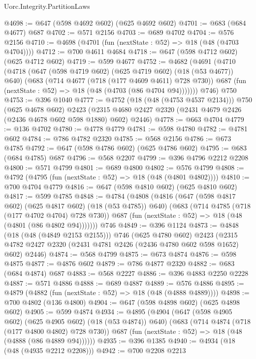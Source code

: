 \begin{lexlean}{Uorc.Integrity.PartitionLaws}
\begin{coremodule}
@4698 := @647 (@598 @4692 @602) (@625 @4692 @602)
@4701 := @683 (@684 @4677) @687
@4702 := @571 @2156
@4703 := @689 @4702
@4704 := @576 @2156
@4710 := @4698 (@4701 (fun (nextState : @52) => @18 (@48 (@4703 @4704))))
@4712 := @700 @4611 @4684
@4718 := @647 (@598 @4712 @602) (@625 @4712 @602)
@4719 := @599 @4677
@4752 := @4682
    (@4691
      (@4710
        (@4718
          (@647 (@598 @4719 @602) (@625 @4719 @602) (@18 (@53 @4677)) @640)
          (@683
            (@714 @4677 (@718 (@177 @4609 @4611) @728 @730))
            @687
            (fun (nextState : @52) => @18 (@48 (@4703 (@86 @4704 @94)))))))
      @746)
    @750
@4753 := @396 @1040
@4777 := @4752
    (@18 (@48 (@4753 @4537 @2134)))
    @750
    (@625 @4678 @602)
    @2423
    (@2315 @4680 @2427 @2320 (@2431 @4679 @2426 (@2436 @4678 @602 @598 @1880) @602) @2446)
@4778 := @663 @4704
@4779 := @136 @4702
@4780 := @4778 @4779
@4781 := @598 @4780
@4782 := @4781 @602
@4784 := @786 @4782 @2320
@4785 := @568 @2156
@4786 := @673 @4785
@4792 := @647 (@598 @4786 @602) (@625 @4786 @602)
@4795 := @683 (@684 @4785) @687
@4796 := @568 @2207
@4799 := @396 @4796 @2212 @2208
@4800 := @571 @4799
@4801 := @689 @4800
@4802 := @576 @4799
@4808 := @4792 (@4795 (fun (nextState : @52) => @18 (@48 (@4801 @4802))))
@4810 := @700 @4704 @4779
@4816 := @647 (@598 @4810 @602) (@625 @4810 @602)
@4817 := @599 @4785
@4848 := @4784
    (@4808
      (@4816
        (@647 (@598 @4817 @602) (@625 @4817 @602) (@18 (@53 @4785)) @640)
        (@683
          (@714 @4785 (@718 (@177 @4702 @4704) @728 @730))
          @687
          (fun (nextState : @52) => @18 (@48 (@4801 (@86 @4802 @94)))))))
    @746
@4849 := @396 @1124
@4873 := @4848
    (@18 (@48 (@4849 @2153 @2155)))
    @746
    (@625 @4780 @602)
    @2423
    (@2315 @4782 @2427 @2320 (@2431 @4781 @2426 (@2436 @4780 @602 @598 @1652) @602) @2446)
@4874 := @568 @4799
@4875 := @673 @4874
@4876 := @598 @4875
@4877 := @4876 @602
@4879 := @786 @4877 @2320
@4882 := @683 (@684 @4874) @687
@4883 := @568 @2227
@4886 := @396 @4883 @2250 @2228
@4887 := @571 @4886
@4888 := @689 @4887
@4889 := @576 @4886
@4895 := @4879 (@4882 (fun (nextState : @52) => @18 (@48 (@4888 @4889))))
@4898 := @700 @4802 (@136 @4800)
@4904 := @647 (@598 @4898 @602) (@625 @4898 @602)
@4905 := @599 @4874
@4934 := @4895
    (@4904
      (@647 (@598 @4905 @602) (@625 @4905 @602) (@18 (@53 @4874)) @640)
      (@683
        (@714 @4874 (@718 (@177 @4800 @4802) @728 @730))
        @687
        (fun (nextState : @52) => @18 (@48 (@4888 (@86 @4889 @94))))))
@4935 := @396 @1385
@4940 := @4934 (@18 (@48 (@4935 @2212 @2208)))
@4942 := @700 @2208 @2213

\end{coremodule}
\end{lexlean}
